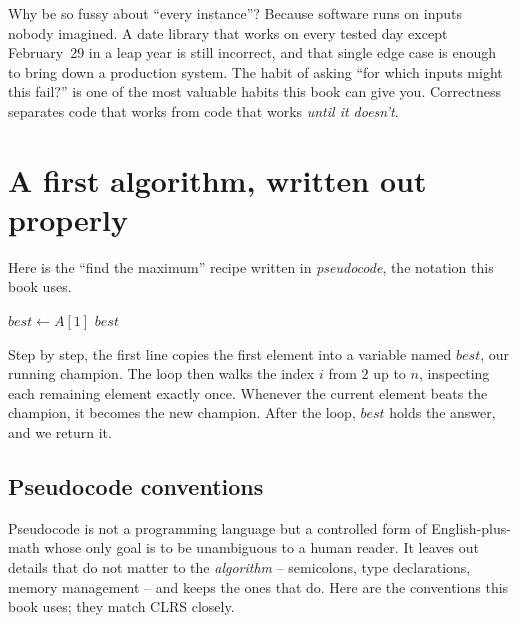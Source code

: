 \begin{aestheticbox}
Why be so fussy about ``every instance''? Because software runs on inputs nobody
imagined. A date library that works on every tested day except February~29 in a leap year
is still incorrect, and that single edge case is enough to bring down a production system. The habit of asking ``for which inputs might
this fail?'' is one of the most valuable habits this book can give you. Correctness
separates code that works from code that works \emph{until it doesn't}.
\end{aestheticbox}

\section{A first algorithm, written out properly}

Here is the ``find the maximum'' recipe written in \emph{pseudocode}, the notation this book uses.

\begin{algorithm}[H]
\caption{\textsc{Find-Max}: largest element of a list}
$best \gets A[1]$\;
\Return $best$\;
\end{algorithm}

Step by step, the first line copies the first element into a variable named
$best$, our running champion. The loop then walks the index $i$ from $2$ up to $n$,
inspecting each remaining element exactly once. Whenever the current element beats
the champion, it becomes the new champion. After the loop, $best$ holds the answer,
and we return it.

\subsection{Pseudocode conventions}

Pseudocode is not a programming language but a controlled form of English-plus-math
whose only goal is to be unambiguous to a human reader. It leaves out details that
do not matter to the \emph{algorithm} -- semicolons, type declarations, memory
management -- and keeps the ones that do. Here are the conventions this
book uses; they match CLRS closely.

